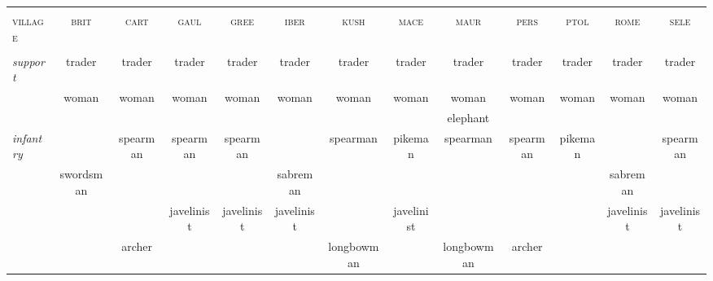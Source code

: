 \documentclass{article}
\newcommand{\brit}{\textsc{\color{blue} brit}}
\newcommand{\cart}{\textsc{\color{blue} cart}}
\newcommand{\gaul}{\textsc{\color{blue} gaul}}
\newcommand{\gree}{\textsc{\color{blue} gree}}
\newcommand{\iber}{\textsc{\color{blue} iber}}
\newcommand{\kush}{\textsc{\color{blue} kush}}
\newcommand{\mace}{\textsc{\color{blue} mace}}
\newcommand{\maur}{\textsc{\color{blue} maur}}
\newcommand{\pers}{\textsc{\color{blue} pers}}
\newcommand{\ptol}{\textsc{\color{blue} ptol}}
\newcommand{\rome}{\textsc{\color{blue} rome}}
\newcommand{\sele}{\textsc{\color{blue} sele}}
\newcommand{\village}{\textsc{\color{blue} village}}
\begin{document}
\begin{landscape}
\footnotesize

\begin{tabular}{l||c|c|c|c||c|c|c|c||c|c|c|c}
\hline
\hline
 &                &                &                &                &                &                &                &                &                &                &                &                \\
\village %
 & \brit          & \cart          & \gaul          & \gree          & \iber          & \kush          & \mace          & \maur          & \pers          & \ptol          & \rome          & \sele          \\
 &                &                &                &                &                &                &                &                &                &                &                &                \\
\hline
\hline\textit{support}
 & trader         & trader         & trader         & trader         & trader         & trader         & trader         & trader         & trader         & trader         & trader         & trader         \\
 & woman          & woman          & woman          & woman          & woman          & woman          & woman          & woman          & woman          & woman          & woman          & woman          \\
 &                &                &                &                &                &                &                & elephant       &                &                &                &                \\
\hline\textit{infantry}
 &                & spearman       & spearman       & spearman       &                & spearman       & pikeman        & spearman       & spearman       & pikeman        &                & spearman       \\
 & swordsman      &                &                &                & sabreman       &                &                &                &                &                & sabreman       &                \\
 &                &                & javelinist     & javelinist     & javelinist     &                & javelinist     &                &                &                & javelinist     & javelinist     \\
 &                & archer         &                &                &                & longbowman     &                & longbowman     & archer         &                &                &                \\

\end{tabular}
\end{landscape}
\end{document}
